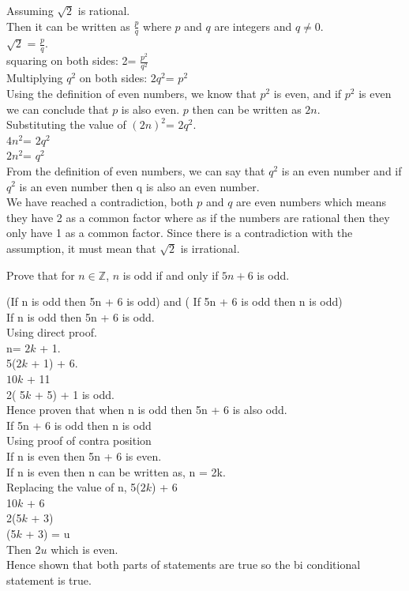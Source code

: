 \documentclass[a4paper]{exam}
\theoremstyle{definition}
\newcommand\Z{\ensuremath{\mathbb{Z}}}
\begin{document}
\begin{questions}
\begin{solution}
    Assuming $\sqrt{2}$ is rational.\\
    Then it can be written as $\frac{p}{q}$ where $p$ and $q$ are integers and $q\neq 0$.\\
    $\sqrt{2}$ = $\frac{p}{q}$.\\
    squaring on both sides: 2= $\frac{p^2}{q^2}$\\
    Multiplying $q^2$ on both sides: $2q^2$= $p^2$\\
    Using the definition of even numbers, we know that $p^2$ is even, and if $p^2$ is even we can conclude that $p$ is also even. $p$ then can be written as $2n$.\\
    Substituting the value of $(2n)^2$= $2q^2$. \\
     $4n^2$= $2q^2$\\
     $2n^2$= $q^2$\\
     From the definition of even numbers, we can say that $q^2$ is an even number and if $q^2$ is an even number then q is also an even number.\\
     We have reached a contradiction, both $p$ and $q$ are even numbers which means they have 2 as a common factor where as if the numbers are rational then they only have 1 as a common factor. 
     Since there is a contradiction with the assumption, it must mean that  $\sqrt{2}$ is irrational.   
  \end{solution}
  

\question Prove that for $n\in\Z$, $n$ is odd if and only if $5n + 6$ is odd.

  \begin{solution}
    
   (If n is odd then 5n + 6 is odd) and ( If 5n + 6 is odd then n is odd)\\
   If n is odd then 5n + 6 is odd. \\
   Using direct proof.\\
   n= $2k$ + 1.\\
   5($2k$ + 1) + 6.\\
   $10k$ + 11\\
   2( 5$k$ + 5) + 1 is odd.\\
   Hence proven that when n is odd then 5n + 6 is also odd.\\
   If 5n + 6 is odd then n is odd\\
   Using proof of contra position\\
    If n is even then 5n + 6 is even.\\
    If n is even then n can be written as, n = 2k.\\
    Replacing the value of n,  5($2k$) + 6  \\
    10$k$ + 6\\
    2(5$k$ + 3)\\
    (5$k$ + 3) = u\\
    Then 2$u$ which is even.\\
    Hence shown that both parts of statements are true so the bi conditional statement is true.
  \end{solution}


\end{questions}
\end{document}
